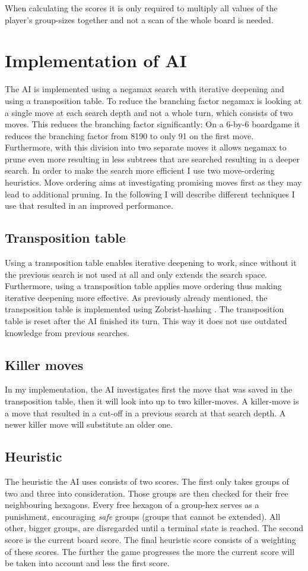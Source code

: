 \documentclass[a4paper]{article}
\begin{document}
When calculating the scores it is only required to multiply all values of the player's group-sizes together and not a scan of the whole board is needed.


\section{Implementation of AI}
The AI is implemented using a negamax search with iterative deepening and using a transposition table. To reduce the branching factor negamax is looking at a single move at each search depth and not a whole turn, which consists of two moves. This reduces the branching factor significantly: On a 6-by-6 boardgame it reduces the branching factor from 8190 to only 91 on the first move. Furthermore, with this division into two separate moves it allows negamax to prune even more resulting in less subtrees that are searched resulting in a deeper search. In order to make the search more efficient I use two move-ordering heuristics. Move ordering aims at investigating promising moves first as they may lead to additional pruning. In the following I will describe different techniques I use that resulted in an improved performance.

\subsection{Transposition table}
Using a transposition table enables iterative deepening to work, since without it the previous search is not used at all and only extends the search space. Furthermore, using a transposition table applies move ordering thus making iterative deepening more effective. As previously already mentioned, the transposition table is implemented using Zobrist-hashing \cite{galler1964improved}. The transposition table is reset after the AI finished its turn. This way it does not use outdated knowledge from previous searches.

\subsection{Killer moves}
In my implementation, the AI investigates first the move that was saved in the transposition table, then it will look into up to two killer-moves. A killer-move is a move that resulted in a cut-off in a previous search at that search depth. A newer killer move will substitute an older one.

\subsection{Heuristic}
The heuristic the AI uses consists of two scores. The first only takes groups of two and three into consideration. Those groups are then checked for their free neighbouring hexagons. Every free hexagon of a group-hex serves as a punishment, encouraging \textit{safe} groups (groups that cannot be extended). All other, bigger groups, are disregarded until a terminal state is reached. The second score is the current board score. The final heuristic score consists of a weighting of these scores. The further the game progresses the more the current score will be taken into account and less the first score.
\end{document}
